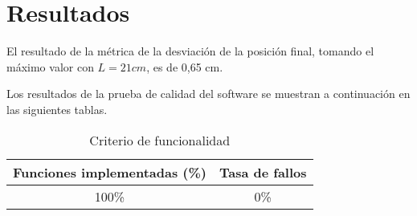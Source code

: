 \section{Resultados}

El resultado de la métrica de la desviación de la posición final, tomando el máximo valor con $L = 21 cm$, es de 0,65 cm.

Los resultados de la prueba de calidad del software se muestran a continuación en las siguientes tablas.

\begin{table}[ht]
	\centering
	\begin{tabular}{|c|c|}
		\hline
		\textbf{Funciones implementadas (\%)} & \textbf{Tasa de fallos} \\
		\hline
		100\% & 0\% \\
		\hline
	\end{tabular}
	\caption{Criterio de funcionalidad}
	\label{tab:Resultados}
\end{table}